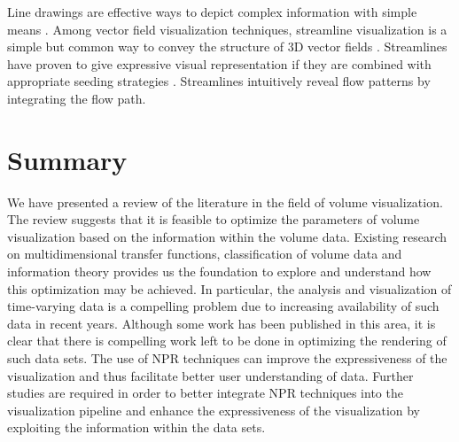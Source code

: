 Line drawings are effective ways to depict complex information with simple means \cite{benard_state_art_2011}. Among vector field visualization techniques, streamline visualization is a simple but common way to convey the structure of 3D vector fields \cite{chen_illustrative_2011}. Streamlines have proven to give expressive visual representation if they are combined with appropriate seeding strategies \cite{annen_vector_2008}. Streamlines intuitively reveal flow patterns by integrating the flow path.

\section{Summary}
We have presented a review of the literature in the field of volume visualization.
The review suggests that it is feasible to optimize the parameters of volume visualization based on the information within the volume data. Existing research on multidimensional transfer functions, classification of volume data and information theory provides us the foundation to explore and understand how this optimization may be achieved.
In particular, the analysis and visualization of time-varying data is a compelling problem due to increasing availability of such data in recent years. Although some work has been published in this area, it is clear that there is compelling work left to be done in optimizing the rendering of such data sets.
The use of NPR techniques can improve the expressiveness of the visualization and thus facilitate better user understanding of data.
Further studies are required in order to better integrate NPR techniques into the visualization pipeline and enhance the expressiveness of the visualization by exploiting the information within the data sets.


